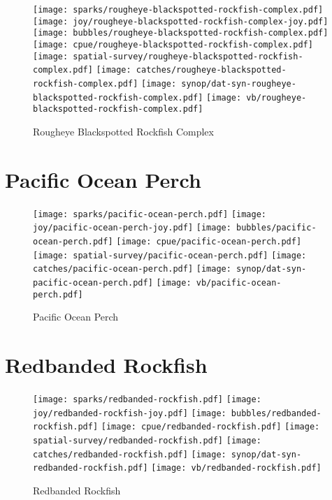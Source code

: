 \begin{figure}[htbp]
\centering
\texttt{[image: sparks/rougheye-blackspotted-rockfish-complex.pdf]}
\texttt{[image: joy/rougheye-blackspotted-rockfish-complex-joy.pdf]}
\texttt{[image: bubbles/rougheye-blackspotted-rockfish-complex.pdf]}
\texttt{[image: cpue/rougheye-blackspotted-rockfish-complex.pdf]}
\texttt{[image: spatial-survey/rougheye-blackspotted-rockfish-complex.pdf]}
\texttt{[image: catches/rougheye-blackspotted-rockfish-complex.pdf]}
\texttt{[image: synop/dat-syn-rougheye-blackspotted-rockfish-complex.pdf]}
\texttt{[image: vb/rougheye-blackspotted-rockfish-complex.pdf]}
\caption{Rougheye Blackspotted Rockfish Complex}
\end{figure}
\clearpage
\section{Pacific Ocean Perch}

\begin{figure}[htbp]
\centering
\texttt{[image: sparks/pacific-ocean-perch.pdf]}
\texttt{[image: joy/pacific-ocean-perch-joy.pdf]}
\texttt{[image: bubbles/pacific-ocean-perch.pdf]}
\texttt{[image: cpue/pacific-ocean-perch.pdf]}
\texttt{[image: spatial-survey/pacific-ocean-perch.pdf]}
\texttt{[image: catches/pacific-ocean-perch.pdf]}
\texttt{[image: synop/dat-syn-pacific-ocean-perch.pdf]}
\texttt{[image: vb/pacific-ocean-perch.pdf]}
\caption{Pacific Ocean Perch}
\end{figure}
\clearpage
\section{Redbanded Rockfish}

\begin{figure}[htbp]
\centering
\texttt{[image: sparks/redbanded-rockfish.pdf]}
\texttt{[image: joy/redbanded-rockfish-joy.pdf]}
\texttt{[image: bubbles/redbanded-rockfish.pdf]}
\texttt{[image: cpue/redbanded-rockfish.pdf]}
\texttt{[image: spatial-survey/redbanded-rockfish.pdf]}
\texttt{[image: catches/redbanded-rockfish.pdf]}
\texttt{[image: synop/dat-syn-redbanded-rockfish.pdf]}
\texttt{[image: vb/redbanded-rockfish.pdf]}
\caption{Redbanded Rockfish}
\end{figure}
\clearpage
